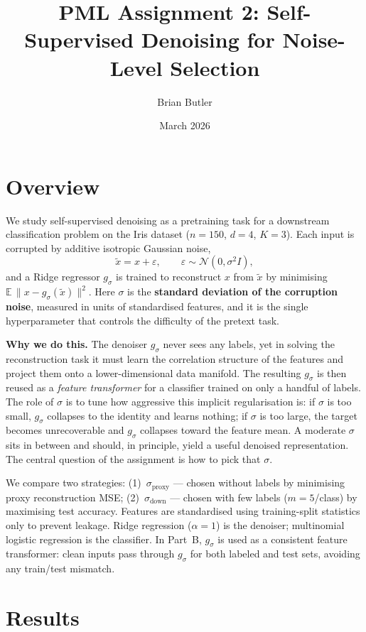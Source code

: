 \documentclass[11pt]{article}
\title{PML Assignment 2: Self-Supervised Denoising for Noise-Level Selection}
\author{Brian Butler}
\date{March 2026}
\begin{document}
\maketitle

\section{Overview}

We study self-supervised denoising as a pretraining task for a downstream
classification problem on the Iris dataset ($n{=}150$, $d{=}4$, $K{=}3$). Each
input is corrupted by additive isotropic Gaussian noise,
\[
\tilde{x} = x + \varepsilon, \qquad \varepsilon \sim \mathcal{N}(0, \sigma^2 I),
\]
and a Ridge regressor $g_\sigma$ is trained to reconstruct $x$ from $\tilde{x}$
by minimising $\mathbb{E}\,\lVert x - g_\sigma(\tilde{x}) \rVert^2$. Here
$\sigma$ is the \textbf{standard deviation of the corruption noise}, measured
in units of standardised features, and it is the single hyperparameter that
controls the difficulty of the pretext task.

\textbf{Why we do this.} The denoiser $g_\sigma$ never sees any labels, yet in
solving the reconstruction task it must learn the correlation structure of the
features and project them onto a lower-dimensional data manifold. The resulting
$g_\sigma$ is then reused as a \emph{feature transformer} for a classifier
trained on only a handful of labels. The role of $\sigma$ is to tune how
aggressive this implicit regularisation is: if $\sigma$ is too small,
$g_\sigma$ collapses to the identity and learns nothing; if $\sigma$ is too
large, the target becomes unrecoverable and $g_\sigma$ collapses toward the
feature mean. A moderate $\sigma$ sits in between and should, in principle,
yield a useful denoised representation. The central question of the assignment
is how to pick that $\sigma$.

We compare two strategies: (1)~$\sigma_{\text{proxy}}$ --- chosen without
labels by minimising proxy reconstruction MSE; (2)~$\sigma_{\text{down}}$ ---
chosen with few labels ($m{=}5$/class) by maximising test accuracy. Features
are standardised using training-split statistics only to prevent leakage.
Ridge regression ($\alpha{=}1$) is the denoiser; multinomial logistic
regression is the classifier. In Part~B, $g_\sigma$ is used as a consistent
feature transformer: clean inputs pass through $g_\sigma$ for both labeled and
test sets, avoiding any train/test mismatch.

\section{Results}
\end{document}
